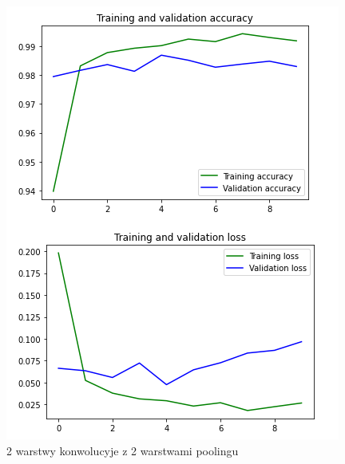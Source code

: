 \documentclass{article}
\begin{document}
\begin{figure}[h]
  \centering
  \includegraphics[width=\linewidth]{2_conv_2_max.png}
  \caption{2 warstwy konwolucyje z 2 warstwami poolingu}
\end{figure}
\end{document}
